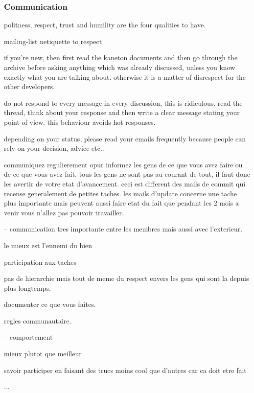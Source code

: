 
\subsubsection{Communication}

politness, respect, trust and humility are the four qualities to have.

mailing-list netiquette to respect

if you're new, then first read the kaneton documents and then go through
the archive before asking anything which was already discussed, unless you
know exactly what you are talking about. otherwise it is a matter of disrespect
for the other developers.

do not respond to every message in every discussion, this is ridiculous.
read the thread, think about your response and then write a clear message
stating your point of view. this behaviour avoids hot responses.

depending on your status, please read your emails frequently because people
can rely on your decision, advice etc..

communiquez regulierement opur informez les gens de ce que vous avez
faire ou de ce que vous avez fait. tous les gens ne sont pas au courant
de tout, il faut donc les avertir de votre etat d'avancement. ceci est
different des mails de commit qui recense generalement de petites taches.
les mails d'update concerne une tache plus importante mais peuvent aussi
faire etat du fait que pendant les 2 mois a venir vous n'allez pas pouvoir
travailler.

--
communication tres importante entre les membres mais aussi avec l'exterieur.

le mieux est l'ennemi du bien

participation aux taches

pas de hierarchie mais tout de meme du respect envers les gens qui sont
la depuis plus longtemps.

documenter ce que vous faites.

%
%

regles communautaire.

-- comportement

mieux plutot que meilleur

savoir participer en faisant des trucs moins cool que d'autres car ca
doit etre fait

...

